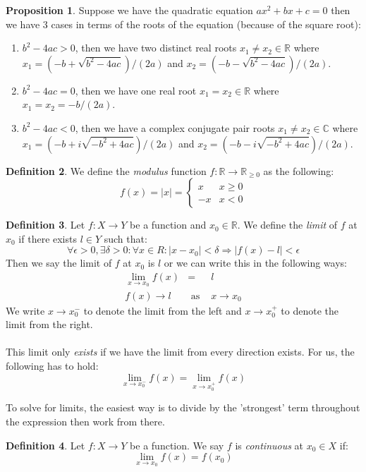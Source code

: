 \documentclass[11pt]{article}
\theoremstyle{definition}
\newtheorem{prop}{Proposition}[section]
\newtheorem{defn}[prop]{Definition}
\newcommand{\brac}[1]{\left(#1\right)}
\newcommand{\abs}[1]{\left\lvert#1\right\rvert}
\newcommand{\R}{\mathbb{R}}
\newcommand{\C}{\mathbb{C}}
\begin{document}
	\begin{prop}
	Suppose we have the quadratic equation $ax^2 + bx + c = 0$ then we have 3 cases in terms of the roots of the equation (because of the square root):
	\begin{enumerate}
		\item $b^2- 4ac >0$, then we have two distinct real roots $x_1\neq x_2\in\R$ where$x_1 = \brac{-b+\sqrt{b^2-4ac}}/\brac{2a}$ and $x_2 = \brac{-b-\sqrt{b^2-4ac}}/\brac{2a}$.
		\item $b^2 - 4ac = 0$, then we have one real root $x_1=x_2\in\R$ where $x_1 = x_2 = -b/\brac{2a}$.
		\item $b^2 - 4ac<0$, then we have a complex conjugate pair roots $x_1\neq x_2 \in\C$ where $x_1 =  \brac{-b+i\sqrt{-b^2+4ac}}/\brac{2a}$ and $x_2 = \brac{-b-i\sqrt{-b^2+4ac}}/\brac{2a}$.
	\end{enumerate}
	\end{prop}
	\begin{defn}
		We define the \emph{modulus} function $f:\R\rightarrow\R_{\geq0}$ as the following:
		$$ f(x) = \abs{x} = \begin{cases} x &  x\geq 0 \\ -x & x<0	\end{cases}$$
	\end{defn}
	\begin{defn}
		Let $f: X\rightarrow Y$	be a function and $x_0 \in \R$. We define the \emph{limit} of $f$ at $x_0$ if there exists $l\in Y$ such that:
		$$ \forall \epsilon>0, \exists \delta>0 : \forall x\in R : \abs{x-x_0} < \delta \Rightarrow \abs{f\brac{x} - l}<\epsilon$$ 
		Then we say the limit of $f$ at $x_0$ is $l$ or we can write this in the following ways:
		\begin{eqnarray*}
			\lim_{x\rightarrow x_0} f\brac{x} &=& l\\
			f\brac{x}\rightarrow l &\text{ as }& x\rightarrow x_0
		\end{eqnarray*}
		We write $x\rightarrow x_0^-$ to denote the limit from the left and $x\rightarrow x_0^+$ to denote the limit from the right. 
		\\\\
		This limit only \emph{exists} if we have the limit from every direction exists. For us, the following has to hold:
		$$\lim_{x\rightarrow x_0^-}f\brac{x} = \lim_{x\rightarrow x_0^+}f\brac{x}$$
	\end{defn}
	To solve for limits, the easiest way is to divide by the 'strongest' term throughout the expression then work from there.
	\begin{defn}
		Let $f:X\rightarrow Y$ be a function. We say $f$ is \emph{continuous} at $x_0 \in X$ if:
		$$ \lim_{x\rightarrow x_0}f\brac{x} = f\brac{x_0}$$
	\end{defn}
\end{document}
